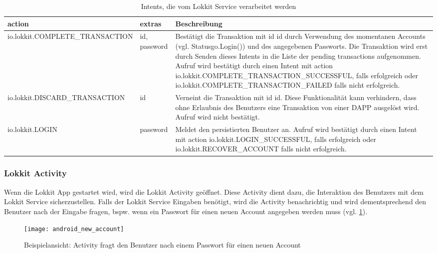 \begin{table}[H]
\centering
\caption{Intents, die vom Lokkit Service verarbeitet werden}
\label{tbl:LokktService_ListenIntents}
\begin{tabular}{@{}L{3cm}L{2cm}L{10cm}@{}}
\toprule
action & extras & Beschreibung\\ \midrule
io.lokkit.\newline{}COMPLETE\newline{}\_TRANSACTION & id, password & Bestätigt die Transaktion mit id id durch Verwendung des momentanen Accounts (vgl. Statusgo.Login()) und des angegebenen Passworts. Die Transaktion wird erst durch Senden dieses Intents in die Liste der pending transactions aufgenommen. Aufruf wird bestätigt durch einen Intent mit action io.lokkit.COMPLETE\_TRANSACTION\_SUCCESSFUL, falls erfolgreich oder io.lokkit.COMPLETE\_TRANSACTION\_FAILED falls nicht erfolgreich. \\\midrule
io.lokkit.\newline{}DISCARD\newline{}\_TRANSACTION  & id           & Verneint die Transaktion mit id id. Diese Funktionalität kann verhindern, dass ohne Erlaubnis des Benutzers eine Transaktion von einer DAPP ausgelöst wird. Aufruf wird nicht bestätigt.\\\midrule
io.lokkit.\newline{}LOGIN & password     & Meldet den persistierten Benutzer an. Aufruf wird bestätigt durch einen Intent mit action io.lokkit.LOGIN\_SUCCESSFUL, falls erfolgreich oder io.lokkit.RECOVER\_ACCOUNT falls nicht erfolgreich.
\\ \bottomrule
\end{tabular}
\end{table}

\subsubsection{Lokkit Activity}
\label{sys_subsubsec:Lokkit_Activity}
Wenn die Lokkit App gestartet wird, wird die Lokkit Activity geöffnet. Diese Activity dient dazu, die Interaktion des Benutzers mit dem Lokkit Service sicherzustellen. Falls der Lokkit Service Eingaben benötigt, wird die Activity benachrichtig und wird dementsprechend den Benutzer nach der Eingabe fragen, bspw. wenn ein Passwort für einen neuen Account angegeben werden muss (vgl. \ref{fig:sys_android_new_account}).

\begin{figure}[H]
\centering
\texttt{[image: android\_new\_account]}
\caption{Beispielansicht: Activity fragt den Benutzer nach einem Passwort für einen neuen Account}
\label{fig:sys_android_new_account}
\end{figure}



